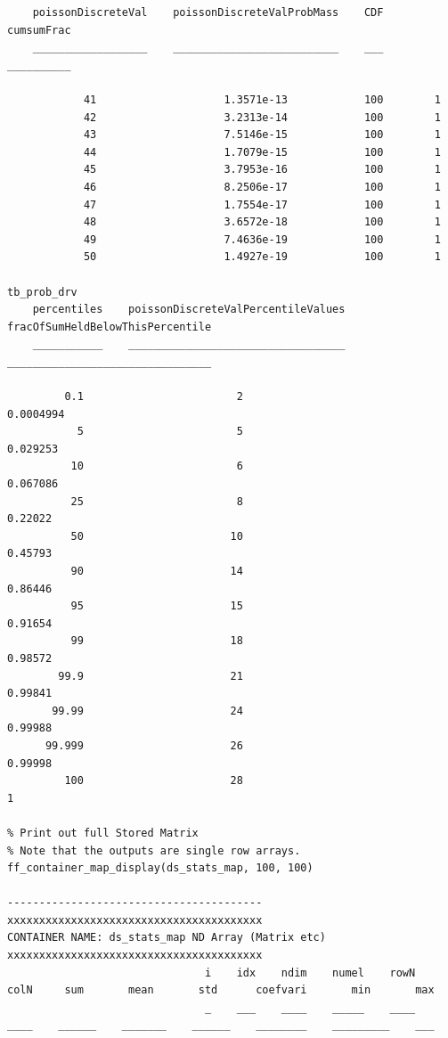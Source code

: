 \documentclass[
]{book}
\begin{document}
\begin{verbatim}
    poissonDiscreteVal    poissonDiscreteValProbMass    CDF    cumsumFrac
    __________________    __________________________    ___    __________

            41                    1.3571e-13            100        1     
            42                    3.2313e-14            100        1     
            43                    7.5146e-15            100        1     
            44                    1.7079e-15            100        1     
            45                    3.7953e-16            100        1     
            46                    8.2506e-17            100        1     
            47                    1.7554e-17            100        1     
            48                    3.6572e-18            100        1     
            49                    7.4636e-19            100        1     
            50                    1.4927e-19            100        1     

tb_prob_drv
    percentiles    poissonDiscreteValPercentileValues    fracOfSumHeldBelowThisPercentile
    ___________    __________________________________    ________________________________

         0.1                        2                               0.0004994            
           5                        5                                0.029253            
          10                        6                                0.067086            
          25                        8                                 0.22022            
          50                       10                                 0.45793            
          90                       14                                 0.86446            
          95                       15                                 0.91654            
          99                       18                                 0.98572            
        99.9                       21                                 0.99841            
       99.99                       24                                 0.99988            
      99.999                       26                                 0.99998            
         100                       28                                       1            

% Print out full Stored Matrix
% Note that the outputs are single row arrays.
ff_container_map_display(ds_stats_map, 100, 100)

----------------------------------------
xxxxxxxxxxxxxxxxxxxxxxxxxxxxxxxxxxxxxxxx
CONTAINER NAME: ds_stats_map ND Array (Matrix etc)
xxxxxxxxxxxxxxxxxxxxxxxxxxxxxxxxxxxxxxxx
                               i    idx    ndim    numel    rowN    colN     sum       mean       std      coefvari       min       max
                               _    ___    ____    _____    ____    ____    ______    _______    ______    ________    _________    ___


\end{verbatim}
\end{document}
